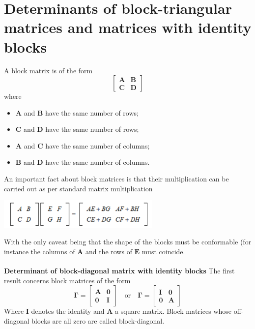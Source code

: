 \documentclass{report}
\begin{document}
\section{Determinants of block-triangular\\matrices and matrices with identity blocks}
A block matrix is of the form
\begin{equation*}
\left[\begin{array}{cc}
\bm A&\bm B\\
\bm C&\bm D
\end{array}\right]
\end{equation*}
where 
\begin{itemize}
\item $\bm A$ and $\bm B$ have the same number of rows;
\item $\bm C$ and $\bm D$ have the same number of rows;
\item $\bm A$ and $\bm C$ have the same number of columns;
\item $\bm B$ and $\bm D$ have the same number of columns.
\end{itemize}
An important fact about block matrices is that their multiplication can be carried out as per standard matrix multiplication
\begin{center}
\includegraphics[width=8cm]{120}
\end{center}
With the only caveat being that the shape of the blocks must be conformable (for instance the columns of $\bm A$ and the rows of $\bm E$ must coincide.\\
\vspace{1mm}\\
\textbf{Determinant of block-diagonal matrix with identity blocks}
The first result concerns block matrices of the form 
\begin{equation*}
\bm\Gamma=\left[\begin{array}{cc}\bm A&\bm 0\\\bm 0&\bm I\end{array}\right]\quad\text{or}\quad\bm\Gamma=\left[\begin{array}{cc}\bm I&\bm 0\\\bm 0&\bm A\end{array}\right]
\end{equation*}
Where $\bm I$ denotes the identity and $\bm A$ a square matrix. Block matrices whose off-diagonal blocks are all zero are called block-diagonal.\\
\end{document}
